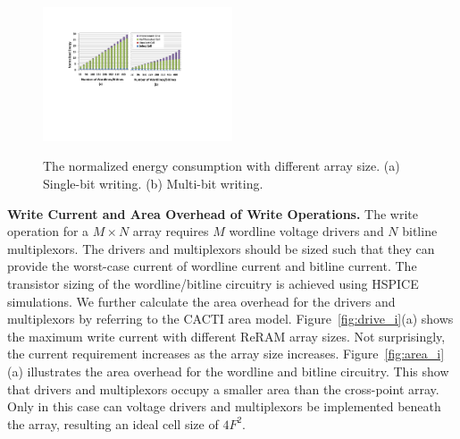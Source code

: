 \begin{figure}%
\centering
  \includegraphics[width=0.5\textwidth]{./figures/energy_f_tall2.pdf}\\
  \caption{The normalized energy consumption with different array size. (a) Single-bit writing. (b) Multi-bit writing.}\label{fig:energy}
    \vspace{-10pt}
\end{figure}

\vspace{5pt}\noindent\textbf{Write Current and Area Overhead of Write Operations.}
%
The write operation for a $M \times N$ array requires $M$ wordline voltage
drivers and $N$ bitline multiplexors. The drivers and multiplexors should
be sized such that they can provide the worst-case current of wordline
current and bitline current. The transistor sizing of the wordline/bitline
circuitry is achieved using HSPICE simulations. We further calculate the
area overhead for the drivers and multiplexors by referring to the CACTI
area model. Figure~\ref{fig:drive_i}(a) shows the maximum write current
with different ReRAM array sizes. Not surprisingly, the current
requirement increases as the array size increases.
Figure~\ref{fig:area_i}(a) illustrates the area overhead for the wordline
and bitline circuitry. This show that drivers and multiplexors occupy a
smaller area than the cross-point array. Only in this case can voltage
drivers and multiplexors be implemented beneath the array, resulting an
ideal cell size of $4F^2$.


